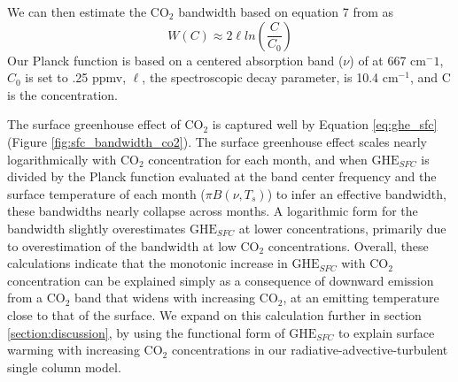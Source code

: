 \documentclass[draft]{agujournal2019}
\begin{document}
We can then estimate the CO$_2$ bandwidth based on equation 7 from  as
\begin{equation}\label{eq:bandwidth}
    W(C) \approx 2\ell ln(\frac{C}{C_0})
\end{equation}
Our Planck function is based on a centered absorption band ($\nu$) of  at 667 cm$^-1$, $C_0$ is set to .25 ppmv, $\ell$, the spectroscopic decay parameter, is 10.4 cm$^{-1}$, and C is the  concentration. 

The surface greenhouse effect of CO$_2$ is captured well by Equation \ref{eq:ghe_sfc} (Figure \ref{fig:sfc_bandwidth_co2}). The surface greenhouse effect scales nearly logarithmically with CO$_2$ concentration for each month, and when ${\text{GHE}_{SFC}}$ is divided by the Planck function evaluated at the band center frequency and the surface temperature of each month ($\pi B(\nu,T_s)$) to infer an effective bandwidth, these bandwidths nearly collapse across months. A logarithmic form for the bandwidth slightly overestimates ${\text{GHE}_{SFC}}$ at lower  concentrations, primarily due to overestimation of the bandwidth at low CO$_2$ concentrations. Overall, these calculations indicate that the monotonic increase in ${\text{GHE}_{SFC}}$ with CO$_2$ concentration can be explained simply as a consequence of downward emission from a CO$_2$ band that widens with increasing CO$_2$, at an emitting temperature close to that of the surface. We expand on this calculation further in section \ref{section:discussion}, by using the functional form of ${\text{GHE}_{SFC}}$ to explain surface warming with increasing CO$_2$ concentrations in our radiative-advective-turbulent single column model.
\end{document}
